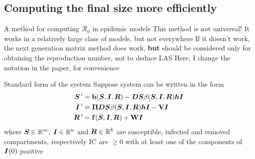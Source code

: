 \documentclass[aspectratio=169]{beamer}\usepackage[]{graphicx}\usepackage[]{xcolor}
\begin{document}

\subsection{Computing the final size more efficiently}


\begin{frame}{A method for computing $\mathcal{R}_0$ in epidemic models}
\bbullet This method is not universal! It works in a relatively large class of models, but not everywhere
\vfill
\bbullet If it doesn't work, the next generation matrix method does work, \textbf{but} should be considered only for obtaining the reproduction number, not to deduce LAS
\vfill
\bbullet Here, I change the notation in the paper, for convenience
\end{frame}

\begin{frame}{Standard form of the system}
Suppose system can be written in the form
\begin{subequations}\label{sys:SIR_general}
\begin{align}
\bm{S}\,' &= \mathbf{b}(\bm{S},\bm{I},\bm{R})-\bm{D}\bm{S}\beta(\bm{S},\bm{I},\bm{R})\bm{h}\bm{I} \label{sys:SIR_general_dS} \\
\bm{I}\,' &= \bm{\Pi}\bm{D}\bm{S}\beta(\bm{S},\bm{I},\bm{R})\bm{h}\bm{I}-\mathbf{V}\bm{I} \label{sys:SIR_general_dI} \\
\bm{R}\,' &= \mathbf{f}(\bm{S},\bm{I},\bm{R})+\mathbf{W}\bm{I} \label{sys:SIR_general_dR}
\end{align}
\end{subequations}
\vfill
where $\bm{S}\in\mathbb{R}^m$, $\bm{I}\in\mathbb{R}^n$ and $\bm{R}\in\mathbb{R}^k$ are susceptible, infected and removed compartments, respectively
\vfill
IC are $\geq 0$ with at least one of the components of $\bm{I}(0)$ positive
\end{frame}  
\end{document}
